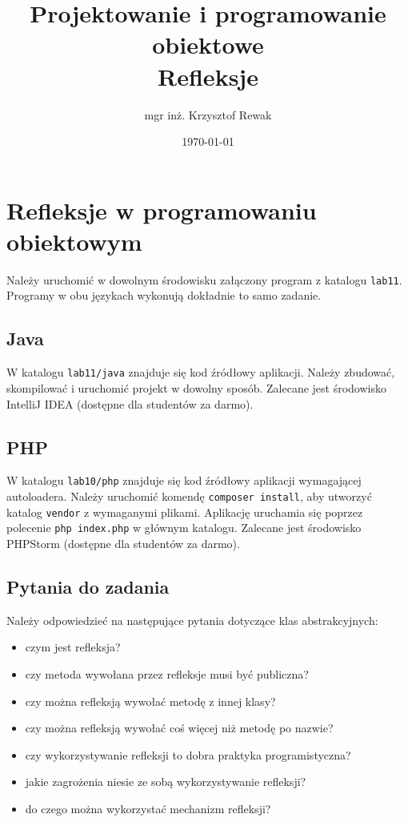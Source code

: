 \documentclass{article}
\title{
	Projektowanie i programowanie obiektowe \\
	\Huge{Refleksje}
}
\author{mgr inż. Krzysztof Rewak}
\date{\today}
\begin{document}
	\maketitle
	
	\section{Refleksje w programowaniu obiektowym}
	Należy uruchomić w dowolnym środowisku załączony program z katalogu \texttt{lab11}. Programy w obu językach wykonują dokładnie to samo zadanie.
	
	\subsection{Java}
	W katalogu \texttt{lab11/java} znajduje się kod źródłowy aplikacji. Należy zbudować, skompilować i uruchomić projekt w dowolny sposób. Zalecane jest środowisko IntelliJ IDEA (dostępne dla studentów za darmo).
	
	\subsection{PHP}
	W katalogu \texttt{lab10/php} znajduje się kod źródłowy aplikacji wymagającej autoloadera. Należy uruchomić komendę \texttt{composer install}, aby utworzyć katalog \texttt{vendor} z wymaganymi plikami. Aplikację uruchamia się poprzez polecenie \texttt{php index.php} w głównym katalogu. Zalecane jest środowisko PHPStorm (dostępne dla studentów za darmo).
	
	\subsection{Pytania do zadania}
	Należy odpowiedzieć na następujące pytania dotyczące klas abstrakcyjnych:
	\begin{itemize}
		\item czym jest refleksja?
		\item czy metoda wywołana przez refleksje musi być publiczna?
		\item czy można refleksją wywołać metodę z innej klasy?
		\item czy można refleksją wywołać coś więcej niż metodę po nazwie?
		\item czy wykorzystywanie refleksji to dobra praktyka programistyczna?
		\item jakie zagrożenia niesie ze sobą wykorzystywanie refleksji?
		\item do czego można wykorzystać mechanizm refleksji?
	\end{itemize}
\end{document}
